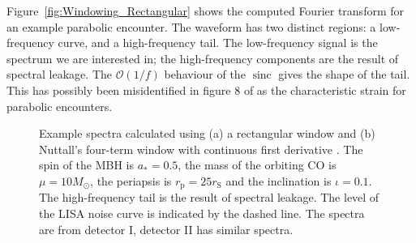 \documentclass[useAMS,usedcolumn,usegraphicx,usenatbib]{mn2e}
\newcommand{\Figref}[1]{Figure~\ref{fig:#1}}
\DeclareMathOperator{\sinc}{sinc}
\newcommand{\sub}[1]{\ensuremath{_\mathrm{#1}}}
\newcommand{\order}[1]{\ensuremath{\mathcal{O}({#1})}}
\begin{document}
\Figref{Windowing_Rectangular} shows the computed Fourier transform for an example parabolic encounter. The waveform has two distinct regions: a low-frequency curve, and a high-frequency tail. The low-frequency signal is the spectrum we are interested in; the high-frequency components are the result of spectral leakage. The $\order{1/{f}}$ behaviour of the $\sinc$ gives the shape of the tail. This has possibly been misidentified in figure 8 of \citet{Burko2007} as the characteristic strain for parabolic encounters.

\begin{figure}
  \begin{center}
    \quad
    \caption{Example spectra calculated using (a) a rectangular window and (b) Nuttall's four-term window with continuous first derivative \citep{Nuttall1981}. The spin of the MBH is $a_\ast = 0.5$, the mass of the orbiting CO is $\mu = 10 M_\odot$, the periapsis is $r\sub{p} = 25 r\sub{S}$ and the inclination is $\iota = 0.1$. The high-frequency tail is the result of spectral leakage. The level of the LISA noise curve is indicated by the dashed line. The spectra are from detector I, detector II has similar spectra.}
    \label{fig:Windowing}
  \end{center}
\end{figure}
\end{document}
